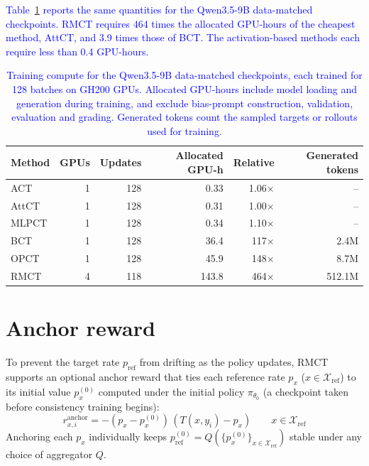 \textcolor{blue}{Table~\ref{tab:compute-qwen128} reports the same quantities for the Qwen3.5-9B data-matched checkpoints.} \textcolor{blue}{RMCT requires 464 times the allocated GPU-hours of the cheapest method, AttCT, and 3.9 times those of BCT.} \textcolor{blue}{The activation-based methods each require less than 0.4 GPU-hours.}

\begin{table}[!tp]\centering
\caption{\textcolor{blue}{Training compute for the Qwen3.5-9B data-matched checkpoints, each trained for 128 batches on GH200 GPUs.} \textcolor{blue}{Allocated GPU-hours include model loading and generation during training, and exclude bias-prompt construction, validation, evaluation and grading.} \textcolor{blue}{Generated tokens count the sampled targets or rollouts used for training.}}
\label{tab:compute-qwen128}
\color{blue}\begin{tabular}{lrrrrr}\toprule
Method & GPUs & Updates & Allocated GPU-h & Relative & Generated tokens\\\midrule
ACT & 1 & 128 & 0.33 & 1.06$\times$ & --\\
AttCT & 1 & 128 & 0.31 & 1.00$\times$ & --\\
MLPCT & 1 & 128 & 0.34 & 1.10$\times$ & --\\
BCT & 1 & 128 & 36.4 & 117$\times$ & 2.4M\\
OPCT & 1 & 128 & 45.9 & 148$\times$ & 8.7M\\
RMCT & 4 & 118 & 143.8 & 464$\times$ & 512.1M\\\bottomrule
\end{tabular}\end{table}



\FloatBarrier
\section{Anchor reward}
\label{app:anchor}

To prevent the target rate $p_{\text{ref}}$ from drifting as the policy
updates, RMCT supports an optional anchor reward that ties each reference
rate $p_x$ ($x \in \mathcal{X}_{\text{ref}}$) to its initial value $p^{(0)}_x$
computed under the initial policy $\pi_{\theta_0}$ (a checkpoint taken before
consistency training begins):
\begin{equation}
r^{\text{anchor}}_{x,i} = -(p_x - p^{(0)}_x)\,(T(x, y_i) - p_x)
\qquad x \in \mathcal{X}_{\text{ref}}
\end{equation}
Anchoring each $p_x$ individually
keeps $p^{(0)}_{\text{ref}} = Q(\{p^{(0)}_x\}_{x \in \mathcal{X}_{\text{ref}}})$
stable under any choice of aggregator $Q$.

